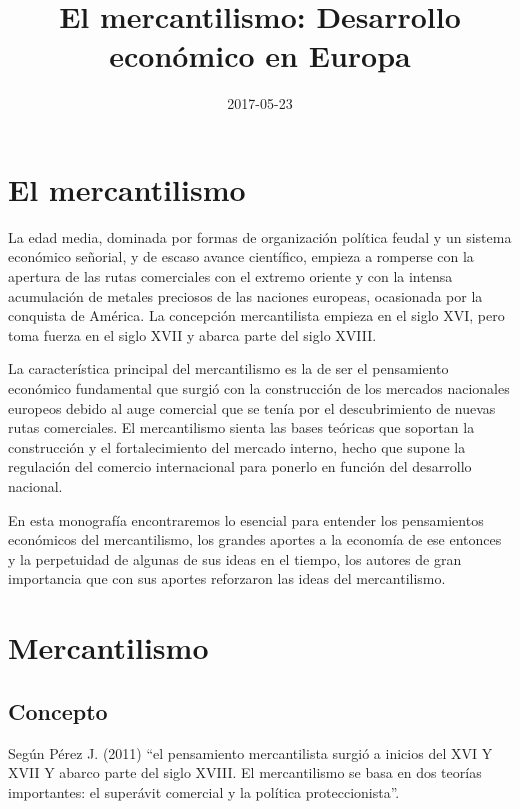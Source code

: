 \documentclass[
  jou,
  floatsintext,
  longtable,
  a4paper,
  nolmodern,
  notxfonts,
  notimes,
  colorlinks=true,linkcolor=blue,citecolor=blue,urlcolor=blue]{apa7}
\title{El mercantilismo: Desarrollo económico en Europa}
\date{2017-05-23}
\begin{document}
\maketitle

\hypertarget{toc}{}
\tableofcontents
\newpage
\section[Introduction]{El mercantilismo}

\setcounter{secnumdepth}{-\maxdimen} %

\setlength\LTleft{0pt}


La edad media, dominada por formas de organización política feudal y un
sistema económico señorial, y de escaso avance científico, empieza a
romperse con la apertura de las rutas comerciales con el extremo oriente
y con la intensa acumulación de metales preciosos de las naciones
europeas, ocasionada por la conquista de América. La concepción
mercantilista empieza en el siglo XVI, pero toma fuerza en el siglo XVII
y abarca parte del siglo XVIII.

La característica principal del mercantilismo es la de ser el
pensamiento económico fundamental que surgió con la construcción de los
mercados nacionales europeos debido al auge comercial que se tenía por
el descubrimiento de nuevas rutas comerciales. El mercantilismo sienta
las bases teóricas que soportan la construcción y el fortalecimiento del
mercado interno, hecho que supone la regulación del comercio
internacional para ponerlo en función del desarrollo nacional.

En esta monografía encontraremos lo esencial para entender los
pensamientos económicos del mercantilismo, los grandes aportes a la
economía de ese entonces y la perpetuidad de algunas de sus ideas en el
tiempo, los autores de gran importancia que con sus aportes reforzaron
las ideas del mercantilismo.

\section{Mercantilismo}\label{mercantilismo}

\subsection{Concepto}\label{concepto}

Según Pérez J. (2011) ``el pensamiento mercantilista surgió a inicios
del XVI Y XVII Y abarco parte del siglo XVIII. El mercantilismo se basa
en dos teorías importantes: el superávit comercial y la política
proteccionista''.
\end{document}
